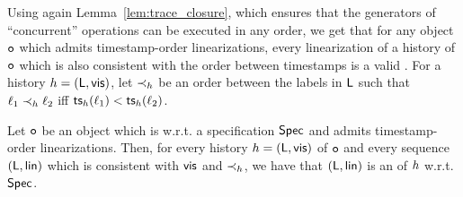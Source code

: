 %

Using again Lemma~\ref{lem:trace_closure}, which ensures that the generators of ``concurrent'' operations can be executed in any order, we get that for any \crdtlinearizable{} object $\mathtt{o}$ which admits timestamp-order linearizations, every linearization of a history of $\mathtt{o}$ which is also consistent with the order between timestamps is a valid \crdtlinearization{}.
For a history ${h}=(\mathsf{L},\mathsf{vis})$, let $\prec_{{h}}$ be an order between the labels in $\mathsf{L}$ such that $\ell_1\prec_{{h}}\ell_2$ iff $\mathsf{ts}_{{h}}(\ell_1) < \mathsf{ts}_{{h}}(\ell_2)$.

\begin{lemma}
Let $\mathtt{o}$ be an object which is \crdtlinearizable{} w.r.t. a specification $\mathsf{Spec}$ and admits timestamp-order linearizations. Then, for every history ${h}=(\mathsf{L},\mathsf{vis})$ of $\mathtt{o}$ and every sequence $(\mathsf{L},\mathsf{lin})$ which is consistent with $\mathsf{vis}$ and $\prec_{{h}}$, we have that $(\mathsf{L},\mathsf{lin})$ is an \crdtlinearization{} of ${h}$ w.r.t. $\mathsf{Spec}$.
\end{lemma}


